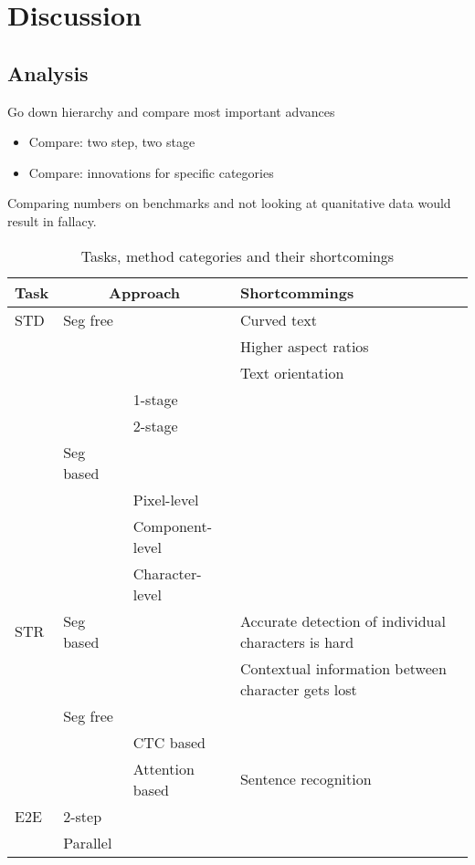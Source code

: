 \chapter{Discussion}\label{ch:discussion}
\section{Analysis}
Go down hierarchy and compare most important advances
\begin{itemize}
    \item Compare: two step, two stage
    \item Compare: innovations for specific categories
\end{itemize}

Comparing numbers on benchmarks and not looking at quanitative data would result in fallacy.

\begin{table}[ht]
    \centering\scriptsize
    \begin{tabular}{p{}p{}p{}p{}}
        Task & \multicolumn{2}{c}{Approach} & Shortcommings \\
        \toprule
        STD & Seg free
              & & Curved text~\citep{long_scene_2021} \\
            & & & Higher aspect ratios~\citep{long_scene_2021,shi_detecting_2017}\\
            & & & Text orientation~\citep{shi_detecting_2017} \\
            & & 1-stage & \\
            & & 2-stage & \\
            & Seg based & & \\
            & & Pixel-level & \\
            & & Component-level & \\
            & & Character-level & \\
        \midrule
        STR & Seg based
              & & Accurate detection of individual characters is hard~\citep{chen_text_2021} \\
            & & & Contextual information between character gets lost~\citep{chen_text_2021}\\
            & Seg free & & \\
            & & CTC based &  \\
            & & Attention based
                & Sentence recognition \\
        \midrule
        E2E & 2-step & & \\
            & Parallel & & \\
        \bottomrule
    \end{tabular}
    \caption{Tasks, method categories and their shortcomings\label{tb:steps-properties}}
\end{table}

